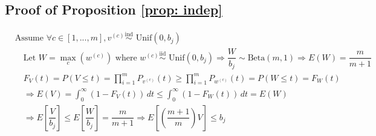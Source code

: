 \documentclass{article} %
\begin{document}
\subsection{Proof of Proposition \ref{prop: indep}}
\label{app: indep}
\begin{align*}
    & \textrm{Assume } \forall c \in [1,...,m], v^{(c)} \overset{\textrm{ind}}{\sim} \textrm{ Unif}(0, b_j) \\
    & \quad \textrm{Let } W = \max_c \left( w^{(c)} \right) \textrm{ where } w^{(c)} \overset{\textrm{iid}}{\sim} \textrm{ Unif}(0, b_j) \Longrightarrow \dfrac{W}{b_j} \sim \textrm{Beta}(m, 1) \Longrightarrow E(W) = \dfrac{m}{m + 1} \\
    & \quad F_V(t) = P(V \leq t) = \prod_{i = 1}^m P_{v^{(c)}}(t) \geq \prod_{i = 1}^m P_{w^{(c)}}(t) = P(W \leq t) = F_W(t) \\
    & \quad \Longrightarrow E(V) = \int_0^\infty (1 - F_V(t)) \,dt \leq \int_0^\infty (1 - F_W(t)) \,dt = E(W) \\
    & \quad \Longrightarrow E \left[ \dfrac{V}{b_j} \right] \leq E \left[ \dfrac{W}{b_j} \right] = \dfrac{m}{m + 1} \Longrightarrow E \left[ \left( \dfrac{m + 1}{m} \right) V \right] \leq b_j \\
    \nonumber 
\end{align*} 


%


\end{document}
